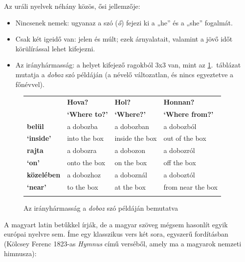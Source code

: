 \begin{multicols}{2}

Az uráli nyelvek néhány közös, ősi jel\-lem\-ző\-je:

\begin{itemize}
\item Nincsenek nemek: ugyanaz a szó (\textit{ő}) fejezi ki a „he” és a „she” fogalmát.
\item Csak két igeidő van: jelen és múlt; ezek árnyalatait, valamint a jövő időt körülírással lehet kifejezni.
\item Az irányhármasság: a helyet kifejező ragokból 3x3 van, mint az \ref{doboz}.~táblázat mutatja a \textit{doboz} szó példáján (a névelő változatlan, és nincs egyeztetve a főnévvel).
\end{itemize}

\begin{figure}[htb]
  \setlength{\tabcolsep}{2em}
  \begin{tabularx}{\textwidth}{llll} \toprule\addlinespace
    \textbf{} & \textbf{Hova?} & \textbf{Hol?} & \textbf{Honnan?}\\
    \textbf{} & \textbf{`Where to?'} & \textbf{`Where?'} & \textbf{`Where from?'}\\
     \addlinespace\midrule\addlinespace
    \textbf{belül} & a dobozba & a dobozban & a dobozból\\
    \textbf{`inside'} & into the box & inside the box & out of the box\\
    \addlinespace\midrule\addlinespace
    \textbf{rajta} & a dobozra & a dobozon & a dobozról\\
    \textbf{`on'} & onto the box & on the box & off the box\\ 
    \addlinespace\midrule\addlinespace
    \textbf{közelében} & a dobozhoz & a doboznál & a doboztól\\
    \textbf{`near'} & to the box & at the box & from near the box\\ \addlinespace\bottomrule
  \end{tabularx}
  \caption{Az irányhármasság a \textit{doboz} szó példáján bemutatva}
  \label{doboz}
\end{figure}

A magyart latin betűkkel írják, de a ma\-gyar szöveg mégsem hasonlít egyik európai nyelvre sem. Íme egy klasszikus vers két sora, egyszerű fordításban (Kölcsey Ferenc 1823-as \textit{Hymnus} című verséből, amely ma a magyarok nemzeti himnusza):

\begin{verse}


\end{verse}
\end{multicols}

